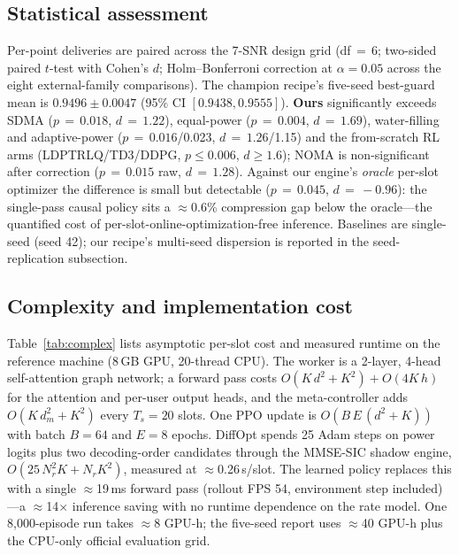 \documentclass[journal]{IEEEtran}
\begin{document}
\subsection{Statistical assessment}
Per-point deliveries are paired across the 7-SNR design grid (df\,$=$\,6;
two-sided paired $t$-test with Cohen's $d$; Holm--Bonferroni correction at
$\alpha=0.05$ across the eight external-family comparisons). The champion
recipe's five-seed best-guard mean is $0.9496\pm0.0047$ (95\% CI
$[0.9438,0.9555]$). \textbf{Ours} significantly exceeds SDMA ($p\,{=}\,0.018$,
$d\,{=}\,1.22$), equal-power ($p\,{=}\,0.004$, $d\,{=}\,1.69$), water-filling and
adaptive-power ($p\,{=}\,0.016$/0.023, $d\,{=}\,1.26$/1.15) and the from-scratch
RL arms (LDPTRLQ/TD3/DDPG, $p\le0.006$, $d\ge1.6$); NOMA is non-significant
after correction ($p\,{=}\,0.015$ raw, $d\,{=}\,1.28$). Against our engine's
\emph{oracle} per-slot optimizer the difference is small but detectable
($p\,{=}\,0.045$, $d\,{=}\,-0.96$): the single-pass causal policy sits a
$\approx$0.6\% compression gap below the oracle---the quantified cost of
per-slot-online-optimization-free inference. Baselines are single-seed (seed
42); our recipe's multi-seed dispersion is reported in the seed-replication
subsection.

\subsection{Complexity and implementation cost}
Table~\ref{tab:complex} lists asymptotic per-slot cost and measured runtime on
the reference machine (8\,GB GPU, 20-thread CPU). The worker is a 2-layer,
4-head self-attention graph network; a forward pass costs
$O(K\,d^2 + K^2) + O(4K\,h)$ for the attention and per-user output heads, and
the meta-controller adds $O(K\,d_m^2 + K^2)$ every $T_s{=}20$ slots. One PPO
update is $O(B\,E\,(d^2+K))$ with batch $B{=}64$ and $E{=}8$ epochs. DiffOpt
spends 25 Adam steps on power logits plus two decoding-order candidates through
the MMSE-SIC shadow engine, $O(25\,N_r^2K + N_r K^2)$, measured at
$\approx$0.26\,s/slot. The learned policy replaces this with a single
$\approx$19\,ms forward pass (rollout FPS 54, environment step included)---a
$\approx$14$\times$ inference saving with no runtime dependence on the rate
model. One 8{,}000-episode run takes $\approx$8 GPU-h; the five-seed report uses
$\approx$40 GPU-h plus the CPU-only official evaluation grid.
\end{document}
